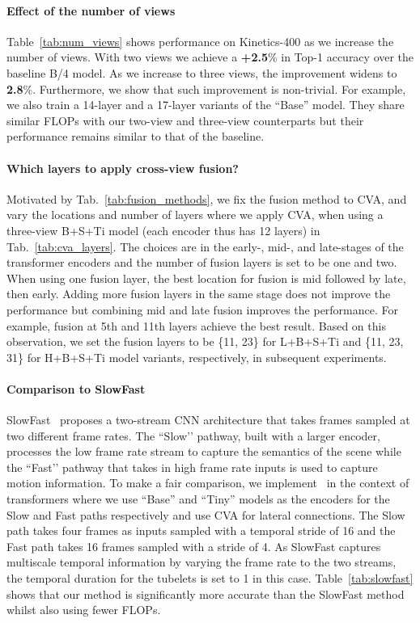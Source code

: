 \paragraph{Effect of the number of views}
Table~\ref{tab:num_views} shows performance on Kinetics-400 as we increase the number of views.
With two views we achieve a \textbf{+2.5}\% in Top-1 accuracy over the baseline B/4 model.
As we increase to three views, the improvement widens to \textbf{2.8}\%.
Furthermore, we show that such improvement is non-trivial. For example, we also train a 14-layer and a 17-layer variants of the ``Base'' model. They share similar FLOPs with our two-view and three-view counterparts but their performance remains similar to that of the baseline.


\paragraph{Which layers to apply cross-view fusion?}
Motivated by Tab.~\ref{tab:fusion_methods}, we fix the fusion method to CVA, and vary the locations and number of layers where we apply CVA, when using a three-view B+S+Ti model (each encoder thus has 12 layers) in Tab.~\ref{tab:cva_layers}.
The choices are in the early-, mid-, and late-stages of the transformer encoders and the number of fusion layers is set to be one and two.
When using one fusion layer, the best location for fusion is mid followed by late, then early.
Adding more fusion layers in the same stage does not improve the performance but combining mid and late fusion improves the performance.
For example, fusion at 5th and 11th layers achieve the best result.
Based on this observation, we set the fusion layers to be \{11, 23\} for L+B+S+Ti and \{11, 23, 31\} for H+B+S+Ti model variants, respectively, in subsequent experiments.


\paragraph{Comparison to SlowFast}
SlowFast~\cite{feichtenhofer_iccv_2019} proposes a two-stream CNN architecture that takes frames sampled at two different frame rates. The ``Slow’’ pathway, built with a larger encoder, processes the low frame rate stream to capture the semantics of the scene while the ``Fast’’ pathway that takes in high frame rate inputs is used to capture motion information. 
To make a fair comparison, we implement~\cite{feichtenhofer_iccv_2019} in the context of transformers where we use ``Base'' and ``Tiny'' models as the encoders for the Slow and Fast paths respectively and use CVA for lateral connections. The Slow path takes four frames as inputs sampled with a temporal stride of 16 and the Fast path takes 16 frames sampled with a stride of 4.
As SlowFast captures multiscale temporal information by varying the frame rate to the two streams, the temporal duration for the tubelets is set to 1 in this case.
Table~\ref{tab:slowfast} shows that our method is significantly more accurate than the SlowFast method whilst also using fewer FLOPs.


